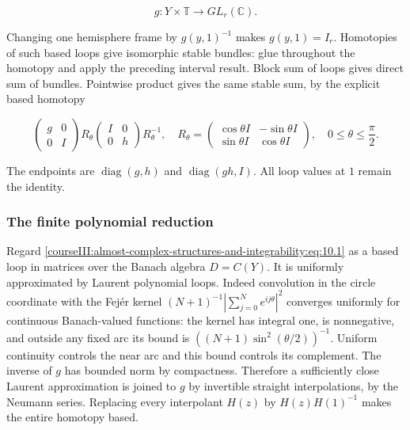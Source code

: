 \begin{equation}
g:Y\times\mathbb T\longrightarrow GL_r(\mathbb C).
\label{courseIII:almost-complex-structures-and-integrability:eq:10.1}
\end{equation}

Changing one hemisphere frame by \(g(y,1)^{-1}\) makes \(g(y,1)=I_r\). Homotopies of such based loops give isomorphic stable bundles: glue throughout the homotopy and apply the preceding interval result. Block sum of loops gives direct sum of bundles. Pointwise product gives the same stable sum, by the explicit based homotopy

\begin{equation}
\begin{pmatrix}g&0\\0&I\end{pmatrix}
R_\theta
\begin{pmatrix}I&0\\0&h\end{pmatrix}R_\theta^{-1},
\quad
R_\theta=
\begin{pmatrix}\cos\theta I&-\sin\theta I\\
\sin\theta I&\cos\theta I\end{pmatrix},
\quad0\leq\theta\leq\frac\pi2.
\label{courseIII:almost-complex-structures-and-integrability:eq:10.2}
\end{equation}

The endpoints are \(\operatorname{diag}(g,h)\) and \(\operatorname{diag}(gh,I)\). All loop values at \(1\) remain the identity.

\subsubsection{The finite polynomial reduction}
\label{courseIII:almost-complex-structures-and-integrability:section-10.2}

Regard \eqref{courseIII:almost-complex-structures-and-integrability:eq:10.1} as a based loop in matrices over the Banach algebra \(D=C(Y)\). It is uniformly approximated by Laurent polynomial loops. Indeed convolution in the circle coordinate with the Fejér kernel
\((N+1)^{-1}|\sum_{j=0}^N e^{ij\theta}|^2\)
converges uniformly for continuous Banach-valued functions: the kernel has integral one, is nonnegative, and outside any fixed arc its bound is \(((N+1)\sin^2(\theta/2))^{-1}\). Uniform continuity controls the near arc and this bound controls its complement. The inverse of \(g\) has bounded norm by compactness. Therefore a sufficiently close Laurent approximation is joined to \(g\) by invertible straight interpolations, by the Neumann series. Replacing every interpolant \(H(z)\) by \(H(z)H(1)^{-1}\) makes the entire homotopy based.

